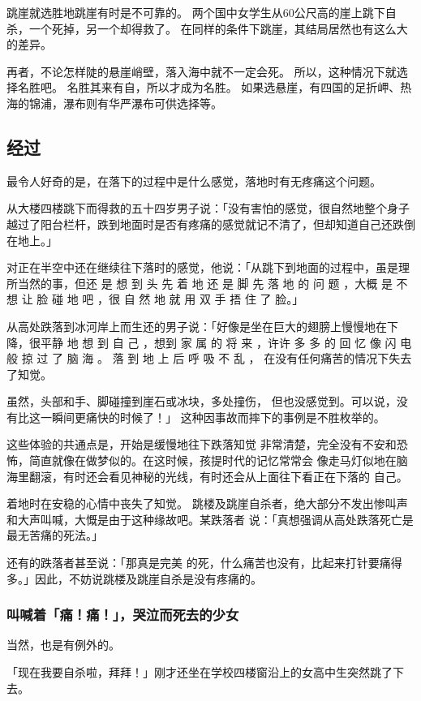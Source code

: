 \documentclass[UTF8]{ctexart}
\begin{document}
跳崖就选胜地跳崖有时是不可靠的。
两个国中女学生从$60$公尺高的崖上跳下自杀，一个死掉，另一个却得救了。
在同样的条件下跳崖，其结局居然也有这么大的差异。

再者，不论怎样陡的悬崖峭壁，落入海中就不一定会死。
所以，这种情况下就选择名胜吧。
名胜其来有自，所以才成为名胜。
如果选悬崖，有四国的足折岬、热海的锦浦，瀑布则有华严瀑布可供选择等。

\subsection{经过}

最令人好奇的是，在落下的过程中是什么感觉，落地时有无疼痛这个问题。

从大楼四楼跳下而得救的五十四岁男子说：「没有害怕的感觉，很自然地整个身子越过了阳台栏杆，跌到地面时是否有疼痛的感觉就记不清了，但却知道自己还跌倒在地上。」

对正在半空中还在继续往下落时的感觉，他说：「从跳下到地面的过程中，虽是理所当然的事，但还 是 想 到 头 先 着 地 还 是 脚 先 落 地 的 问 题 ，大概 是 不 想 让 脸 碰 地 吧 ，很 自 然 地 就 用 双 手 捂 住 了 脸。」

从高处跌落到冰河岸上而生还的男子说：「好像是坐在巨大的翅膀上慢慢地在下降，很平静 地 想 到 自 己 ，想到 家 属 的 将 来 ，许许 多 多 的 回 忆 像 闪 电 般 掠 过 了 脑 海 。
落 到 地 上 后 呼 吸 不 乱 ， 在没有任何痛苦的情况下失去了知觉。

虽然，头部和手、脚碰撞到崖石或冰块，多处撞伤， 但也没感觉到。可以说，没有比这一瞬间更痛快的时候了！」 这种因事故而摔下的事例是不胜枚举的。

这些体验的共通点是，开始是缓慢地往下跌落知觉 非常清楚，完全没有不安和恐怖，简直就像在做梦似的。在这时候，孩提时代的记忆常常会 像走马灯似地在脑海里翻滚，有时还会看见神秘的光线，有时还会从上面往下看正在下落的 自己。

着地时在安稳的心情中丧失了知觉。 
跳楼及跳崖自杀者，绝大部分不发出惨叫声和大声叫喊，大慨是由于这种缘故吧。某跌落者 说：「真想强调从高处跌落死亡是最无苦痛的死法。」

还有的跌落者甚至说：「那真是完美 的死，什么痛苦也没有，比起来打针要痛得多。」因此，不妨说跳楼及跳崖自杀是没有疼痛的。 

\subsubsection*{叫喊着「痛！痛！」，哭泣而死去的少女}

当然，也是有例外的。

「现在我要自杀啦，拜拜！」刚才还坐在学校四楼窗沿上的女高中生突然跳了下去。
\end{document}
